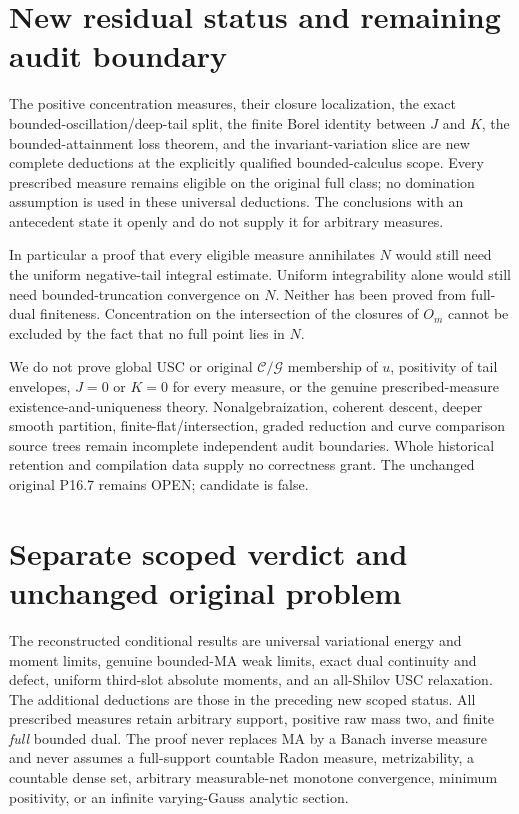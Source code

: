 \documentclass[11pt]{article}
\newcommand{\C}{\mathcal C}
\begin{document}
\section{New residual status and remaining audit boundary}
The positive concentration measures, their closure localization,
the exact bounded-oscillation/deep-tail split, the finite Borel identity
between $J$ and $K$, the bounded-attainment loss theorem, and the
invariant-variation slice are new complete deductions at the explicitly
qualified bounded-calculus scope. Every prescribed measure remains
eligible on the original full class; no domination assumption is used
in these universal deductions. The conclusions with an antecedent
state it openly and do not supply it for arbitrary measures.

In particular a proof that every eligible measure annihilates $N$
would still need the uniform negative-tail integral estimate. Uniform
integrability alone would still need bounded-truncation convergence on
$N$. Neither has been proved from full-dual finiteness. Concentration
on the intersection of the closures of $O_m$ cannot be excluded by
the fact that no full point lies in $N$.

We do not prove global USC or original $\C/\mathcal G$ membership
of $u$, positivity of tail envelopes, $J=0$ or $K=0$ for every
measure, or the genuine prescribed-measure existence-and-uniqueness
theory. Nonalgebraization, coherent descent, deeper smooth partition,
finite-flat/intersection, graded reduction and curve comparison source
trees remain incomplete independent audit boundaries. Whole historical
retention and compilation data supply no correctness grant. The
unchanged original P16.7 remains OPEN; candidate is false.

\section{Separate scoped verdict and unchanged original problem}
The reconstructed conditional results are universal variational energy and moment
limits, genuine bounded-MA weak limits, exact dual continuity and defect,
uniform third-slot absolute moments, and an all-Shilov USC relaxation.
The additional deductions are those in the preceding new scoped status.
All prescribed measures retain arbitrary support, positive raw mass two,
and finite \emph{full} bounded dual. The proof never replaces MA by a
Banach inverse measure and never assumes a full-support countable Radon
measure, metrizability, a countable dense set, arbitrary measurable-net
monotone convergence, minimum positivity, or an infinite varying-Gauss
analytic section.
\end{document}
